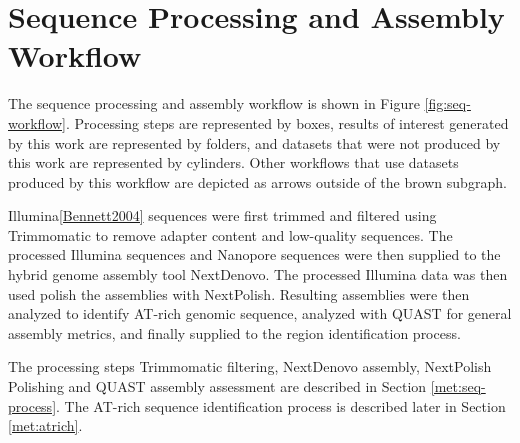 \section{Sequence Processing and Assembly Workflow}
\label{met:seq-workflow}

The sequence processing and assembly workflow is shown in Figure
\ref{fig:seq-workflow}. Processing steps are represented by boxes,
results of interest generated by this work are represented by folders,
and datasets that were not produced by this work are represented by
cylinders. Other workflows that use datasets produced by this workflow
are depicted as arrows outside of the brown subgraph.

Illumina\ref{Bennett2004} sequences were first trimmed and filtered
using Trimmomatic\cite{Bolger2014} to remove adapter content and
low-quality sequences. The processed Illumina sequences and
Nanopore\cite{Wang2021} sequences were then supplied to the hybrid
genome assembly tool NextDenovo\cite{Hu2024}. The processed Illumina
data was then used polish the assemblies with
NextPolish\cite{Hu2020}. Resulting assemblies were then analyzed to
identify AT-rich genomic sequence, analyzed with QUAST for general
assembly metrics, and finally supplied to the region identification
process.

The processing steps Trimmomatic filtering, NextDenovo assembly,
NextPolish Polishing and QUAST assembly assessment are described in
Section \ref{met:seq-process}. The AT-rich sequence identification
process is described later in Section \ref{met:atrich}.

